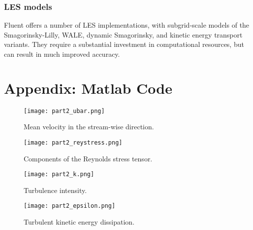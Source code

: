 \documentclass[11pt]{article}
\begin{document}
\subsubsection{LES models}

Fluent offers a number of LES implementations, with subgrid-scale models of the Smagorinsky-Lilly, WALE, dynamic Smagorinsky, and kinetic energy transport variants. They require a substantial investment in computational resources, but can result in much improved accuracy.

\section*{Appendix: Matlab Code}












\begin{figure}[p]
\centering
\texttt{[image: part2\_ubar.png]}
\vspace{6pt}
\caption{Mean velocity in the stream-wise direction.}
\label{fig:part2_ubar}
\end{figure}

\begin{figure}[p]
\centering
\texttt{[image: part2\_reystress.png]}
\vspace{6pt}
\caption{Components of the Reynolds stress tensor.}
\label{fig:part2_reystress}
\end{figure}

\begin{figure}[p]
\centering
\texttt{[image: part2\_k.png]}
\vspace{6pt}
\caption{Turbulence intensity.}
\label{fig:part2_k}
\end{figure}

\begin{figure}[p]
\centering
\texttt{[image: part2\_epsilon.png]}
\vspace{6pt}
\caption{Turbulent kinetic energy dissipation.}
\label{fig:part2_epsilon}
\end{figure}
\end{document}
